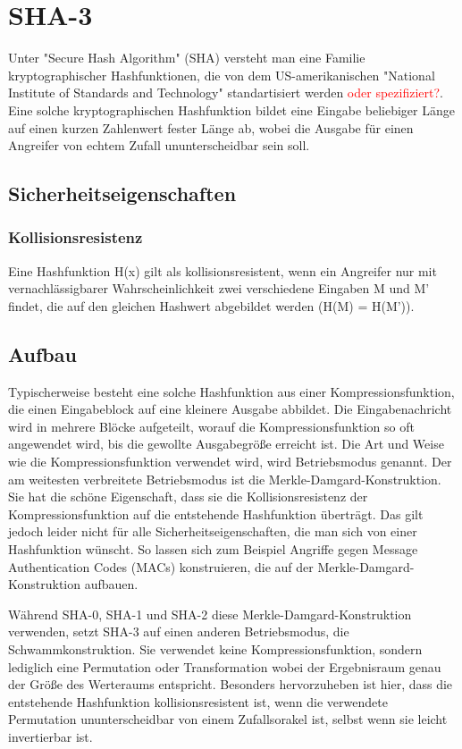 \documentclass{article}
\newcommand\todo[1]{\textcolor{red}{#1}}
\begin{document}
\section{SHA-3}

Unter "Secure Hash Algorithm" (SHA) versteht man eine Familie kryptographischer Hashfunktionen, die von dem US-amerikanischen "National Institute of Standards and Technology" standartisiert werden \todo{oder spezifiziert?}.
Eine solche kryptographischen Hashfunktion bildet eine Eingabe beliebiger Länge auf einen kurzen Zahlenwert fester Länge ab, wobei die Ausgabe für einen Angreifer von echtem Zufall ununterscheidbar sein soll.


\subsection{Sicherheitseigenschaften}

\subsubsection{Kollisionsresistenz}
Eine Hashfunktion H(x) gilt als kollisionsresistent, wenn ein Angreifer nur mit vernachlässigbarer Wahrscheinlichkeit zwei verschiedene Eingaben M und M' findet, die auf den gleichen Hashwert abgebildet werden (H(M) = H(M')).

\subsection{Aufbau}
Typischerweise besteht eine solche Hashfunktion aus einer Kompressionsfunktion, die einen Eingabeblock auf eine kleinere Ausgabe abbildet. Die Eingabenachricht wird in mehrere Blöcke aufgeteilt, worauf die Kompressionsfunktion so
oft angewendet wird, bis die gewollte Ausgabegröße erreicht ist. Die Art und Weise wie die Kompressionsfunktion verwendet wird, wird Betriebsmodus genannt. Der am weitesten verbreitete Betriebsmodus ist die Merkle-Damgard-Konstruktion.
Sie hat die schöne Eigenschaft, dass sie die Kollisionsresistenz der Kompressionsfunktion auf die entstehende Hashfunktion überträgt. Das gilt jedoch leider nicht für alle Sicherheitseigenschaften, die man sich von einer Hashfunktion wünscht.
So lassen sich zum Beispiel Angriffe gegen Message Authentication Codes (MACs) konstruieren, die auf der Merkle-Damgard-Konstruktion aufbauen.

Während SHA-0, SHA-1 und SHA-2 diese Merkle-Damgard-Konstruktion verwenden, setzt SHA-3 auf einen anderen Betriebsmodus, die Schwammkonstruktion. Sie verwendet keine Kompressionsfunktion, sondern lediglich eine Permutation oder Transformation
wobei der Ergebnisraum genau der Größe des Werteraums entspricht. Besonders hervorzuheben ist hier, dass die entstehende Hashfunktion kollisionsresistent ist, wenn die verwendete Permutation ununterscheidbar von einem Zufallsorakel ist,
selbst wenn sie leicht invertierbar ist.
\end{document}
